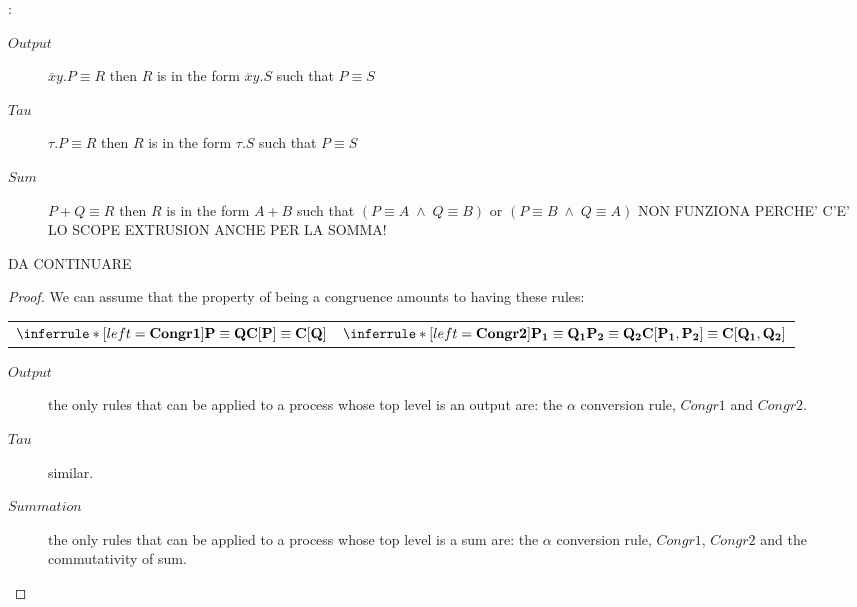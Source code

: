 \begin{lemma}\label{inversionlemmamultiinplatewithh}
  :\begin{description}
    \item[$Output$]
      $\overline{x}y.P \equiv R$ then $R$ is in the form $\overline{x}y.S$ such that $P\equiv S$
    \item[$Tau$]
      $\tau.P \equiv R$ then $R$ is in the form $\tau.S$ such that $P\equiv S$
    \item[$Sum$]
      $P+Q \equiv R$ then $R$ is in the form $A+B$ such that $(P\equiv A\; \wedge\; Q\equiv B)$ or $(P\equiv B\; \wedge\; Q\equiv A)$ NON FUNZIONA PERCHE' C'E' LO SCOPE EXTRUSION ANCHE PER LA SOMMA!
  \end{description}
  DA CONTINUARE
  \begin{proof}
  We can assume that the property of being a congruence amounts to having these rules:
  \begin{center}
    \begin{tabular}{ll}
	$\inferrule* [left=\bf{Congr1}]{
	  P\equiv Q
	}{
	  C[P]\equiv C[Q]
	}$
      &
	$\inferrule* [left=\bf{Congr2}]{
	    P_{1}\equiv Q_{1}
	  \\
	    P_{2}\equiv Q_{2}
	}{
	  C[P_{1}, P_{2}]\equiv C[Q_{1}, Q_{2}]
	}$
    \end{tabular}
  \end{center}
  \begin{description}
    \item[$Output$] the only rules that can be applied to a process whose top level is an output are: the $\alpha$ conversion rule, $Congr1$ and $Congr2$.
    \item[$Tau$] similar.
    \item[$Summation$] the only rules that can be applied to a process whose top level is a sum are: the $\alpha$ conversion rule, $Congr1$, $Congr2$ and the commutativity of sum.

  \end{description}
  \end{proof}
\end{lemma}


